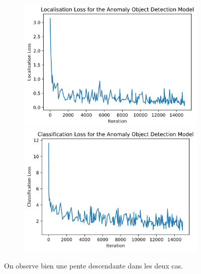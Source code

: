 \documentclass[french]{article}
\theoremstyle{mytheoremstyle}
\theoremstyle{mytheoremstyle}
\theoremstyle{myproblemstyle}
\begin{document}
    \begin{figure}[H]
        \centering
        \begin{subfigure}{\linewidth}
            \includegraphics[width=.5\textwidth]{images/od_loc_loss.png}
            \hfill
            \includegraphics[width=.5\textwidth]{images/od_cla_loss.png}
        \end{subfigure}
        \caption{On observe bien une pente descendante dans les deux cas.}
    \end{figure}
    
\end{document}
